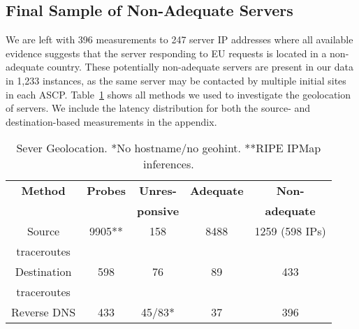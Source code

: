 \subsection{Final Sample of Non-Adequate Servers}
\label{subsec:finalsample}
We are left with 396 measurements to 247 server IP addresses where all available
evidence suggests that the server responding to EU requests is located in a non-adequate country.
These potentially non-adequate servers are present in our data in 1,233 instances,
as the same server may be contacted by multiple initial sites in each ASCP. 
Table~\ref{tab:servergeo} shows all methods we used to investigate the geolocation of servers.
We include the latency distribution for both the source- and destination-based measurements in the
appendix.
\begin{table}
  \caption{Sever Geolocation. *No hostname/no geohint. **RIPE IPMap inferences.}
  \label{tab:servergeo}
  \begin{tabular}{ccccc}
    \toprule
    \textbf{Method} & \textbf{Probes} & \textbf{Unres-} & \textbf{Adequate} & \textbf{Non-}\\
     &  & \textbf{ponsive} &  & \textbf{adequate}\\
    \toprule
    Source& 9905**  & 158 &  8488 & 1259 (598 IPs)\\
    traceroutes &   &  &   & \\
    \midrule
    Destination &598 & 76 & 89 & 433\\
    traceroutes &   &  &   & \\
    \midrule
    Reverse DNS & 433 & 45/83* & 37 & 396 \\

  \bottomrule
\end{tabular}
\end{table}



